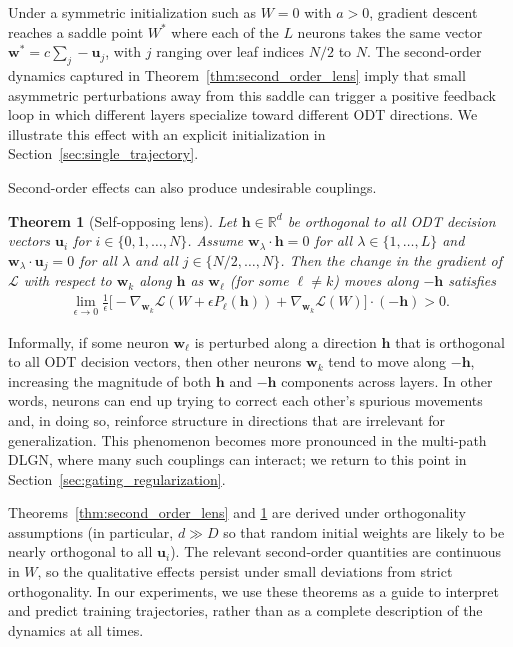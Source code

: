 \documentclass{article}
\theoremstyle{plain}
\newtheorem{theorem}{Theorem}[section]
\theoremstyle{definition}
\theoremstyle{remark}
\newcommand{\R}{{\mathbb R}}
\newcommand{\1}{{\mathbf 1}}
\newcommand{\0}{{\mathbf 0}}
\newcommand{\h}{{\mathbf h}}
\newcommand{\w}{{\mathbf w}}
\newcommand{\bu}{{\mathbf u}}
\renewcommand{\>}{{\rightarrow}}
\begin{document}
Under a symmetric initialization such as $W=0$ with $a>0$, gradient descent reaches a saddle point $W^*$ where each of the $L$ neurons takes the same vector $\w^* = c\sum_{j} -\bu_j$, with $j$ ranging over leaf indices $N/2$ to $N$. The second-order dynamics captured in Theorem~\ref{thm:second_order_lens} imply that small asymmetric perturbations away from this saddle can trigger a positive feedback loop in which different layers specialize toward different ODT directions. We illustrate this effect with an explicit initialization in Section~\ref{sec:single_trajectory}.

Second-order effects can also produce undesirable couplings.

\begin{theorem}[Self-opposing lens]
\label{thm:second_order_backlash}
Let $\h \in \R^d$ be orthogonal to all ODT decision vectors $\bu_i$ for $i \in \{0,1,\ldots,N\}$. Assume $\w_\lambda \cdot \h = 0$ for all $\lambda \in\{1,\ldots,L\}$ and $\w_\lambda \cdot \bu_j = 0$ for all $\lambda$ and all $j \in \{N/2,\ldots, N\}$. Then the change in the gradient of $\mathcal{L}$ with respect to $\w_k$ along $\h$ as $\w_\ell$ (for some $\ell \neq k$) moves along $-\h$ satisfies
\begin{align*}
\lim_{\epsilon \to 0} \frac{1}{\epsilon} \Big[
 -\nabla_{\w_k} \mathcal{L}(W + \epsilon P_\ell(\h))
 + \nabla_{\w_k} \mathcal{L}(W) \Big]\cdot (-\h) > 0.
\end{align*}
\end{theorem}

Informally, if some neuron $\w_\ell$ is perturbed along a direction $\h$ that is orthogonal to all ODT decision vectors, then other neurons $\w_k$ tend to move along $-\h$, increasing the magnitude of both $\h$ and $-\h$ components across layers. In other words, neurons can end up trying to correct each other’s spurious movements and, in doing so, reinforce structure in directions that are irrelevant for generalization. This phenomenon becomes more pronounced in the multi-path DLGN, where many such couplings can interact; we return to this point in Section~\ref{sec:gating_regularization}.

Theorems~\ref{thm:second_order_lens} and \ref{thm:second_order_backlash} are derived under orthogonality assumptions (in particular, $d \gg D$ so that random initial weights are likely to be nearly orthogonal to all $\bu_i$). The relevant second-order quantities are continuous in $W$, so the qualitative effects persist under small deviations from strict orthogonality. In our experiments, we use these theorems as a guide to interpret and predict training trajectories, rather than as a complete description of the dynamics at all times.
\end{document}

